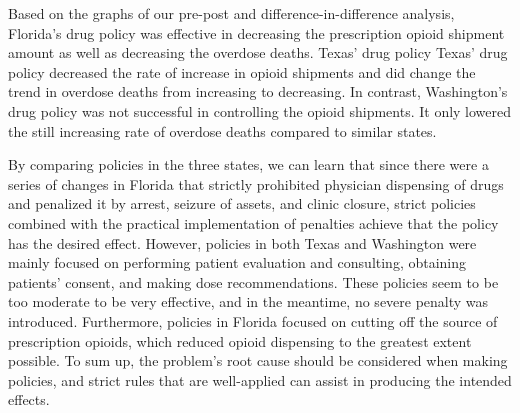\documentclass[12pt,letterpaper]{article}
\begin{document}
Based on the graphs of our pre-post and difference-in-difference analysis, Florida's drug policy was effective in decreasing the prescription opioid shipment amount as well as decreasing the overdose deaths. Texas' drug policy Texas' drug policy decreased the rate of increase in opioid shipments and did change the trend in overdose deaths from increasing to decreasing. In contrast, Washington's drug policy was not successful in controlling the opioid shipments. It only lowered the still increasing rate of overdose deaths compared to similar states.

By comparing policies in the three states, we can learn that since there were a series of changes in Florida that strictly prohibited physician dispensing of drugs and penalized it by arrest, seizure of assets, and clinic closure, strict policies combined with the practical implementation of penalties achieve that the policy has the desired effect. However, policies in both Texas and Washington were mainly focused on performing patient evaluation and consulting, obtaining patients' consent, and making dose recommendations. These policies seem to be too moderate to be very effective, and in the meantime, no severe penalty was introduced. Furthermore, policies in Florida focused on cutting off the source of prescription opioids, which reduced opioid dispensing to the greatest extent possible. To sum up, the problem's root cause should be considered when making policies, and strict rules that are well-applied can assist in producing the intended effects.
\end{document}
